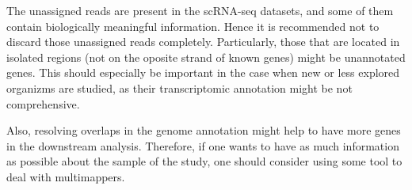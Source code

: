 The unassigned reads are present in the scRNA-seq datasets, and some of them contain biologically meaningful information.
Hence it is recommended not to discard those unassigned reads completely.
Particularly, those that are located in isolated regions
(not on the oposite strand of known genes) might be unannotated genes.
This should especially be important in the case when new or less explored organizms are studied,
as their transcriptomic annotation might be not comprehensive.

Also, resolving overlaps in the genome annotation might help to have more genes in the downstream analysis.
Therefore, if one wants to have as much information as possible about the sample of the study,
one should consider using some tool to deal with multimappers.
